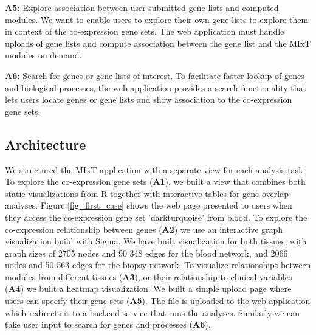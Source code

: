 \textbf{A5:} Explore association between user-submitted gene lists and computed
modules. We want to enable users to explore their own gene lists to explore
them in context of the co-expression gene sets. The web application must handle
uploads of gene lists and compute association between the gene list and the MIxT
modules on demand. 

\textbf{A6:} Search for genes or gene lists of interest. To facilitate faster
lookup of genes and biological processes, the web application provides a search
functionality that lets users locate genes or gene lists and show association to
the co-expression gene sets. 

\subsection{Architecture} 
We structured the MIxT application with a separate view for each analysis task.
To explore the co-expression gene sets (\textbf{A1}), we built a view that
combines both static visualizations from R together with interactive tables for
gene overlap analyses. Figure \ref{fig_first_case} shows the web page presented
to users when they access the co-expression gene set 'darkturquoise' from blood.
To explore the co-expression relationship between genes (\textbf{A2}) we use an
interactive graph visualization build with Sigma.\cite{sigmajs}
We have built visualization for both tissues, with graph sizes of 2705 nodes and
90 348 edges for the blood network, and 2066 nodes and 50 563 edges for the
biopsy network. 
To visualize relationships between modules from different tissues (\textbf{A3}),
or their relationship to clinical variables (\textbf{A4}) we built a heatmap
visualization.
We built a simple upload page where users can specify their gene sets
(\textbf{A5}). The file is uploaded to the web application which redirects it to
a backend service that runs the analyses. Similarly we can take user input to
search for genes and processes (\textbf{A6}).


